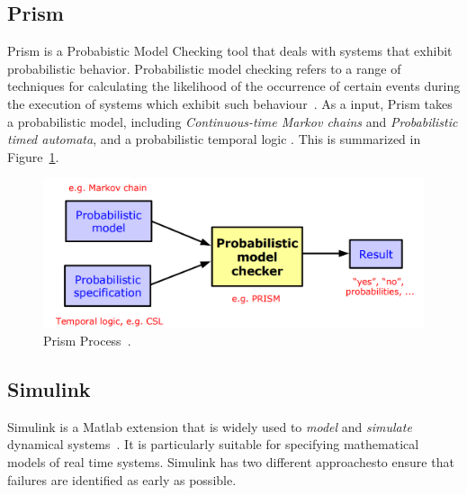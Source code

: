 \paragraph{}

\subsection*{Prism}

Prism is a Probabistic Model Checking tool that deals with systems that exhibit probabilistic behavior. Probabilistic model checking refers to a range of techniques for calculating the likelihood of the occurrence of certain events during the execution of systems which exhibit such behaviour~\cite{prism}. As a input, Prism takes a probabilistic model, including \emph{Continuous-time Markov chains} and \emph{Probabilistic timed automata}, and a probabilistic temporal logic \cite{citacao6}. This is summarized in Figure~\ref{fig:prism}.

\begin{figure} [H]
    \centering
    \includegraphics[width=0.9\linewidth]{chapters/Prism.png}
    \caption[Prism Process]{Prism Process~\cite{prism}.}
    \label{fig:prism}
\end{figure}

\paragraph{}

\subsection*{Simulink}

Simulink is a Matlab extension %
that is widely used to \emph{model} and \emph{simulate} dynamical systems~\cite{Peled2001}. It is particularly suitable for specifying mathematical models of real time systems. Simulink has two different approachesto ensure that failures are identified as early as possible.

